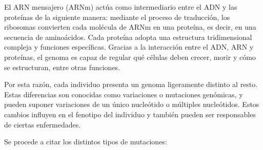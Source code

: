\documentclass[11pt,spanish,listoffigures,listoftables]{tfgetsinf}
\begin{document}
El ARN mensajero (ARNm) actúa como intermediario entre el \acs{ADN} y las proteínas de la siguiente manera: mediante el proceso de traducción, los ribosomas convierten cada molécula de \acs{ARN}m en una proteína, es decir, en una secuencia de aminoácidos. Cada proteína adopta una estructura tridimensional compleja y funciones específicas. Gracias a la interacción entre el ADN, \acs{ARN} y proteínas, el genoma es capaz de regular qué células deben crecer, morir y cómo se estructuran, entre otras funciones\cite{RIN}. 


Por esta razón, cada individuo presenta un genoma ligeramente distinto al resto. Estas diferencias son conocidas como variaciones o mutaciones genómicas, y pueden suponer variaciones de un único nucleótido o múltiples nucleótidos. Estos cambios influyen en el fenotipo del individuo y también pueden ser responsables de ciertas enfermedades. 

Se procede a citar los distintos tipos de mutaciones:
\end{document}
